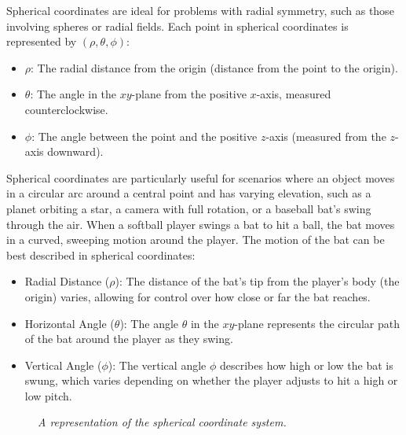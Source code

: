 Spherical coordinates are ideal for problems with radial symmetry, such as those involving spheres or radial fields. Each point in spherical coordinates is represented by \( (\rho, \theta, \phi) \):
\begin{itemize}
    \item \( \rho \): The radial distance from the origin (distance from the point to the origin).
    \item \( \theta \): The angle in the \( xy \)-plane from the positive \( x \)-axis, measured counterclockwise.
    \item \( \phi \): The angle between the point and the positive \( z \)-axis (measured from the \( z \)-axis downward).
\end{itemize}

\noindent Spherical coordinates are particularly useful for scenarios where an object moves in a circular arc around a central point and has varying elevation, such as a planet orbiting a star, a camera with full rotation, or a baseball bat’s swing through the air. When a softball player swings a bat to hit a ball, the bat moves in a curved, sweeping motion around the player. The motion of the bat can be best described in spherical coordinates:
\begin{itemize}
    \item Radial Distance (\( \rho \)): The distance of the bat’s tip from the player’s body (the origin) varies, allowing for control over how close or far the bat reaches.
    \item Horizontal Angle (\( \theta \)): The angle \( \theta \) in the \( xy \)-plane represents the circular path of the bat around the player as they swing.
    \item Vertical Angle (\( \phi \)): The vertical angle \( \phi \) describes how high or low the bat is swung, which varies depending on whether the player adjusts to hit a high or low pitch.
\end{itemize}

\begin{figure}[H]
    \centering
{}
%
%
\caption{\textit{A representation of the spherical coordinate system.}}
\end{figure}


